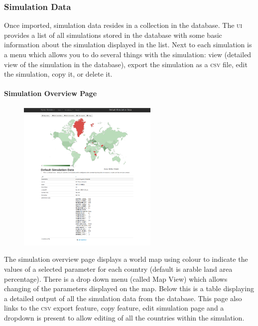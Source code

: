 {\subsubsection{Simulation Data}

Once imported, simulation data resides in a collection in the database. The \textsc{ui} provides a list of all simulations stored in the database with some basic information about the simulation displayed in the list. Next to each simulation is a menu which allows you to do several things with the simulation: view (detailed view of the simulation in the database),  export the simulation as a \textsc{csv} file, edit the simulation, copy it, or delete it.

\paragraph{Simulation Overview Page}

\begin{figure}[h!]
	\centering
	\includegraphics[width=0.6\textwidth]{img/ui2.png}
	\caption{}
\end{figure}

The simulation overview page displays a world map using colour to indicate the values of a selected parameter for each country (default is arable land area percentage). There is a drop down menu (called Map View) which allows changing of the parameters displayed on the map. Below this is a table displaying a detailed output of all the simulation data from the database. This page also links to the \textsc{csv} export feature, copy feature, edit simulation page and a dropdown is present to allow editing of all the countries within the simulation.

}
